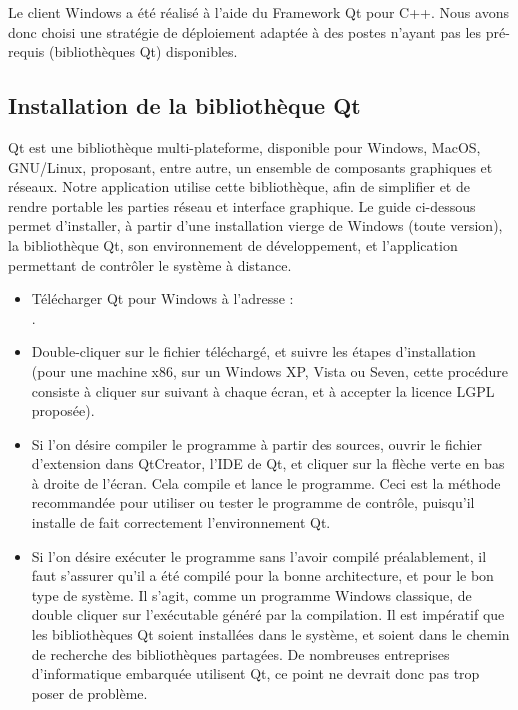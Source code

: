 Le client Windows a été réalisé à l'aide du Framework Qt pour C++. Nous avons
donc choisi une stratégie de déploiement adaptée à des postes n'ayant pas les pré-requis (bibliothèques Qt) disponibles.

\subsection{Installation de la bibliothèque Qt}

Qt est une bibliothèque multi-plateforme, disponible pour Windows, MacOS,
GNU/Linux, proposant, entre autre, un ensemble de composants graphiques et réseaux. Notre
application utilise cette bibliothèque, afin de simplifier et de rendre portable
les parties réseau et interface graphique. Le guide ci-dessous permet d'installer, à partir d'une
installation vierge de Windows (toute version), la bibliothèque Qt, son
environnement de développement, et l'application permettant de contrôler le
système à distance.

\begin{itemize}
    \item Télécharger Qt pour Windows à l'adresse :\\ .
    \item Double-cliquer sur le fichier téléchargé, et suivre les étapes
    d'installation (pour une machine x86, sur un Windows XP, Vista ou Seven,
	    cette procédure consiste à cliquer sur suivant à chaque écran, et à
	    accepter la licence LGPL proposée).
    \item Si l'on désire compiler le programme à partir des sources, ouvrir le
    fichier d'extension  dans QtCreator, l'IDE de Qt, et cliquer sur
    la flèche verte en bas à droite de l'écran. Cela compile et lance le
    programme. Ceci est la méthode recommandée pour utiliser ou tester le
    programme de contrôle, puisqu'il installe de fait correctement
    l'environnement Qt.
    \item Si l'on désire exécuter le programme sans l'avoir compilé
    préalablement, il faut s'assurer qu'il a été compilé pour la bonne
    architecture, et pour le bon type de système. Il s'agit, comme un programme
    Windows classique, de double cliquer sur l'exécutable généré par la
    compilation. Il est impératif que les bibliothèques Qt soient installées
    dans le système, et soient dans le chemin de recherche des bibliothèques
    partagées. De nombreuses entreprises d'informatique embarquée
    utilisent Qt, ce point ne devrait donc pas trop poser de problème.
\end{itemize}

